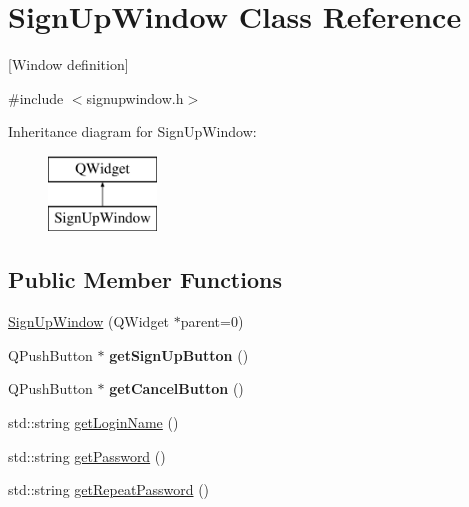 \hypertarget{class_sign_up_window}{}\section{Sign\+Up\+Window Class Reference}
\label{class_sign_up_window}


\mbox{[}Window definition\mbox{]}  




{\ttfamily \#include $<$signupwindow.\+h$>$}

Inheritance diagram for Sign\+Up\+Window\+:\begin{figure}[H]
\begin{center}
\leavevmode
\includegraphics[height=2.000000cm]{class_sign_up_window}
\end{center}
\end{figure}
\subsection*{Public Member Functions}
\begin{DoxyCompactItemize}
\item 
\mbox{\hyperlink{class_sign_up_window_aaf6b145da15912da668cd6a4dc380bd5}{Sign\+Up\+Window}} (Q\+Widget $\ast$parent=0)
\item 
\mbox{\label{class_sign_up_window_ad6c8355890f7d68e1594b208c9ff664d}} 
Q\+Push\+Button $\ast$ {\bfseries get\+Sign\+Up\+Button} ()
\item 
\mbox{\label{class_sign_up_window_a3d2a68bf74ee8ac639117af65dac317a}} 
Q\+Push\+Button $\ast$ {\bfseries get\+Cancel\+Button} ()
\item 
std\+::string \mbox{\hyperlink{class_sign_up_window_a57f7f4f906052c87ea9b0922e74ca657}{get\+Login\+Name}} ()
\item 
std\+::string \mbox{\hyperlink{class_sign_up_window_aa12ab939d6f9ff106c0190c2b330259c}{get\+Password}} ()
\item 
std\+::string \mbox{\hyperlink{class_sign_up_window_aaf6fae547c07d475b902e9aa6a2c7749}{get\+Repeat\+Password}} ()
\end{DoxyCompactItemize}


